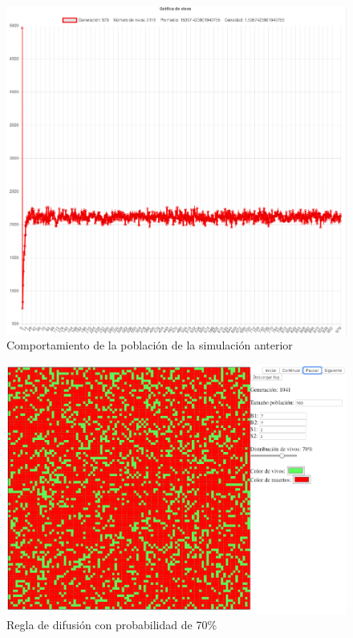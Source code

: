 	\begin{figure}[H]
		\begin{center}
			\includegraphics[scale=.24]{GOL/img/dif60-2.png}
			\caption{Comportamiento de la población de la simulación anterior}
			\label{fig:gol5}
		\end{center}
	\end{figure}

	\begin{figure}[H]
		\begin{center}
			\includegraphics[scale=.3]{GOL/img/dif70-1.png}
			\caption{Regla de difusión con probabilidad de 70\%}
			\label{fig:gol5}
		\end{center}
	\end{figure}

